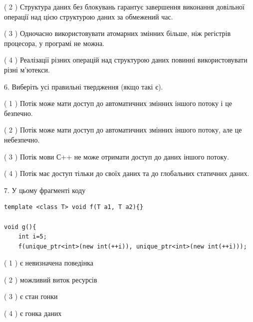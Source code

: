 \documentclass[12pt, ukrainian]{article}
\begin{document}
\begin {large}
{( 2 ) Структура даних без блокувань гарантує завершення виконання довільної операції над цією структурою даних за обмежений час.%

( 3 ) Одночасно використовувати атомарних змінних більше, ніж регістрів процесора, у програмі не можна.%

( 4 ) Реалізації різних операцій над структурою даних повинні використовувати різні м’ютекси.%
\newpage



\vspace{5mm}
6. Виберіть усі правильні твердження (якщо такі є).\par
\vspace{2mm}

( 1 ) Потік може мати доступ до автоматичних змінних іншого потоку і це безпечно.%

( 2 ) Потік може мати доступ до автоматичних змінних іншого потоку, але це небезпечно.%

( 3 ) Потік мови С++ не може отримати доступ до даних іншого потоку.%

( 4 ) Потік має доступ тільки до своїх даних та до глобальних статичних даних.%


\vspace{5mm}
7. У цьому фрагменті коду
\begin{verbatim}
template <class T> void f(T a1, T a2){}

void g(){
    int i=5;
    f(unique_ptr<int>(new int(++i)), unique_ptr<int>(new int(++i)));
\end{verbatim}

( 1 ) є невизначена поведінка%

( 2 ) можливий виток ресурсів%

( 3 ) є стан гонки%

( 4 ) є гонка даних%
}
\end {large}
\end{document}
